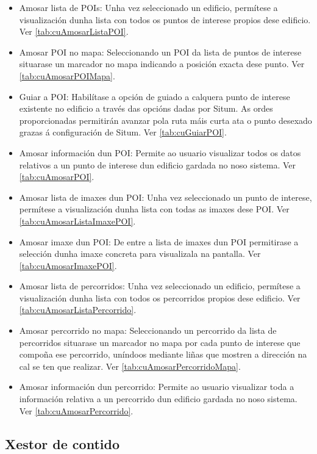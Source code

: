 \begin{itemize}
	\item Amosar lista de POIs: Unha vez seleccionado un edificio, permítese a visualización dunha lista con todos os puntos de interese propios dese edificio. Ver \ref{tab:cuAmosarListaPOI}.
	\item Amosar POI no mapa: Seleccionando un POI da lista de puntos de interese situarase un marcador no mapa indicando a posición exacta dese punto. Ver \ref{tab:cuAmosarPOIMapa}.
	\item Guiar a POI: Habilítase a opción de guiado a calquera punto de interese existente no edificio a través das opcións dadas por Situm. As ordes proporcionadas permitirán avanzar pola ruta máis curta ata o punto desexado grazas á configuración de Situm. Ver \ref{tab:cuGuiarPOI}.
	\item Amosar información dun POI: Permite ao usuario visualizar todos os datos relativos a un punto de interese dun edificio gardada no noso sistema. Ver \ref{tab:cuAmosarPOI}.
	\item Amosar lista de imaxes dun POI: Unha vez seleccionado un punto de interese, permítese a visualización dunha lista con todas as imaxes dese POI. Ver \ref{tab:cuAmosarListaImaxePOI}.
	\item Amosar imaxe dun POI: De entre a lista de imaxes dun POI permitirase a selección dunha imaxe concreta para visualizala na pantalla.  Ver \ref{tab:cuAmosarImaxePOI}.
	\item Amosar lista de percorridos: Unha vez seleccionado un edificio, permítese a visualización dunha lista con todos os percorridos propios dese edificio. Ver \ref{tab:cuAmosarListaPercorrido}.
	\item Amosar percorrido no mapa: Seleccionando un percorrido da lista de percorridos situarase un marcador no mapa por cada punto de interese que compoña ese percorrido, uníndoos mediante liñas que mostren a dirección na cal se ten que realizar. Ver \ref{tab:cuAmosarPercorridoMapa}.
	\item Amosar información dun percorrido: Permite ao usuario visualizar toda a información relativa a un percorrido dun edificio gardada no noso sistema. Ver \ref{tab:cuAmosarPercorrido}.
\end{itemize}


\subsection{Xestor de contido}


